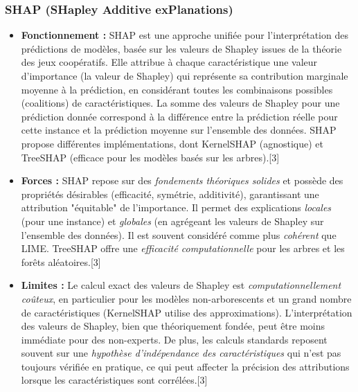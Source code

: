 \documentclass[11pt,a4paper]{article}
\begin{document}
\subsubsection{SHAP (SHapley Additive exPlanations)}
\begin{itemize}
    \item \textbf{Fonctionnement :} SHAP est une approche unifiée pour l'interprétation des prédictions de modèles, basée sur les valeurs de Shapley issues de la théorie des jeux coopératifs. Elle attribue à chaque caractéristique une valeur d'importance (la valeur de Shapley) qui représente sa contribution marginale moyenne à la prédiction, en considérant toutes les combinaisons possibles (coalitions) de caractéristiques. La somme des valeurs de Shapley pour une prédiction donnée correspond à la différence entre la prédiction réelle pour cette instance et la prédiction moyenne sur l'ensemble des données. SHAP propose différentes implémentations, dont KernelSHAP (agnostique) et TreeSHAP (efficace pour les modèles basés sur les arbres).[3]
    \item \textbf{Forces :} SHAP repose sur des \textit{fondements théoriques solides} et possède des propriétés désirables (efficacité, symétrie, additivité), garantissant une attribution "équitable" de l'importance. Il permet des explications \textit{locales} (pour une instance) et \textit{globales} (en agrégeant les valeurs de Shapley sur l'ensemble des données). Il est souvent considéré comme plus \textit{cohérent} que LIME. TreeSHAP offre une \textit{efficacité computationnelle} pour les arbres et les forêts aléatoires.[3]
    \item \textbf{Limites :} Le calcul exact des valeurs de Shapley est \textit{computationnellement coûteux}, en particulier pour les modèles non-arborescents et un grand nombre de caractéristiques (KernelSHAP utilise des approximations). L'interprétation des valeurs de Shapley, bien que théoriquement fondée, peut être moins immédiate pour des non-experts. De plus, les calculs standards reposent souvent sur une \textit{hypothèse d'indépendance des caractéristiques} qui n'est pas toujours vérifiée en pratique, ce qui peut affecter la précision des attributions lorsque les caractéristiques sont corrélées.[3]
\end{itemize}
\end{document}
